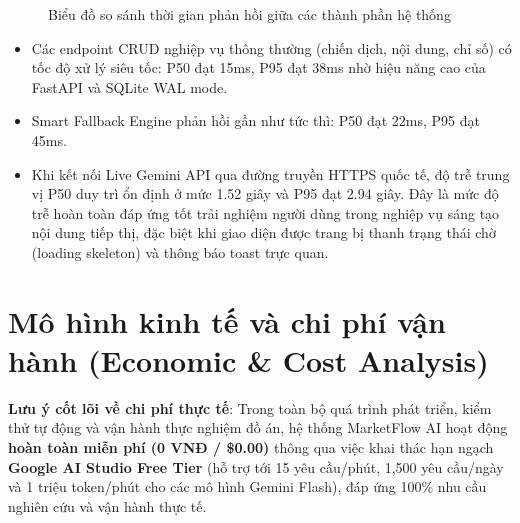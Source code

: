 \begin{figure}[H]
\centering
{}
\caption{Biểu đồ so sánh thời gian phản hồi giữa các thành phần hệ thống}
\label{fig:v9-latency-chart}
\end{figure}

\begin{itemize}[noitemsep,topsep=2pt]
  \item Các endpoint CRUD nghiệp vụ thông thường (chiến dịch, nội dung, chỉ số) có tốc độ xử lý siêu tốc: P50 đạt 15ms, P95 đạt 38ms nhờ hiệu năng cao của FastAPI và SQLite WAL mode.
  \item Smart Fallback Engine phản hồi gần như tức thì: P50 đạt 22ms, P95 đạt 45ms.
  \item Khi kết nối Live Gemini API qua đường truyền HTTPS quốc tế, độ trễ trung vị P50 duy trì ổn định ở mức 1.52 giây và P95 đạt 2.94 giây. Đây là mức độ trễ hoàn toàn đáp ứng tốt trải nghiệm người dùng trong nghiệp vụ sáng tạo nội dung tiếp thị, đặc biệt khi giao diện được trang bị thanh trạng thái chờ (loading skeleton) và thông báo toast trực quan.
\end{itemize}

\section{Mô hình kinh tế và chi phí vận hành (Economic \& Cost Analysis)}

\textbf{Lưu ý cốt lõi về chi phí thực tế}: Trong toàn bộ quá trình phát triển, kiểm thử tự động và vận hành thực nghiệm đồ án, hệ thống MarketFlow AI hoạt động \textbf{hoàn toàn miễn phí (0 VNĐ / \$0.00)} thông qua việc khai thác hạn ngạch \textbf{Google AI Studio Free Tier} (hỗ trợ tới 15 yêu cầu/phút, 1,500 yêu cầu/ngày và 1 triệu token/phút cho các mô hình Gemini Flash), đáp ứng 100\% nhu cầu nghiên cứu và vận hành thực tế.

